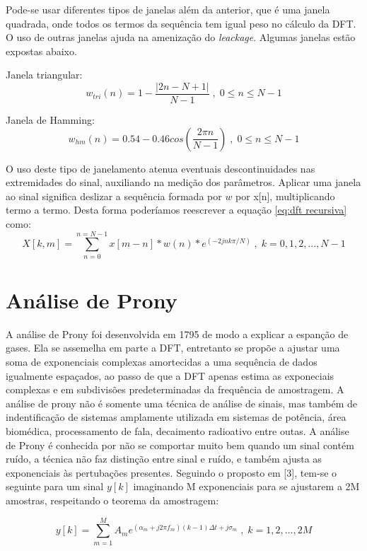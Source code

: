 \indent Pode-se usar diferentes tipos de janelas além da anterior, que é uma janela quadrada, onde todos os termos da sequência tem igual peso no cálculo da DFT. O uso de outras janelas ajuda na amenização do \textit{leackage}. Algumas janelas estão expostas abaixo.

Janela triangular:
\begin{equation}
w_{tri}(n)=1-\frac{|2n-N+1|}{N-1}\;,\;0\leq n \leq N-1
\end{equation}

Janela de Hamming:
\begin{equation}
w_{hm}(n)=0.54-0.46cos(\frac{2\pi n}{N-1})\;,\;0\leq n \leq N-1
\end{equation}

\indent O uso deste tipo de janelamento atenua eventuais descontinuidades nas extremidades do sinal, auxiliando na medição dos parâmetros. Aplicar uma janela ao sinal significa deslizar a sequência formada por $w$ por x[n], multiplicando termo a termo. Desta forma poderíamos reescrever a equação \ref{eq:dft recursiva} como:
\begin{equation}
X[k,m]=\sum_{n=0}^{n=N-1} x[m-n]*w(n)*e^{(-2jnk\pi/N)}\;,\;k=0,1,2,...,N-1
\end{equation}

\section{Análise de Prony}
A análise de Prony foi desenvolvida em 1795 de modo a explicar a espanção de gases. Ela se assemelha em parte a DFT, entretanto se propõe a ajustar uma soma de exponenciais complexas amortecidas a uma sequência de dados igualmente espaçados, ao passo de que a DFT apenas estima as exponeciais complexas e em subdivisões predeterminadas da frequência de amostragem. A análise de prony não é somente uma técnica de análise de sinais, mas também de indentificação de sistemas amplamente utilizada em sistemas de potência, área biomédica, processamento de fala, decaimento radioativo entre outas. 
A análise de Prony é conhecida por não se comportar muito bem quando um sinal contém ruído, a técnica não faz distinção entre sinal e ruído, e também ajusta as exponenciais às pertubações presentes.
Seguindo o proposto em [3], tem-se o seguinte para um sinal $y[k]$ imaginando M exponenciais para se ajustarem a 2M amostras, respeitando o teorema da amostragem:

\Large
\begin{equation}
y[k]=\sum_{m=1}^{M}A_me^{(\alpha_m+j2\pi f_m)(k-1)\Delta t +j\sigma_m}\;,\;k=1,2,...,2M
\end{equation}
\normalsize

